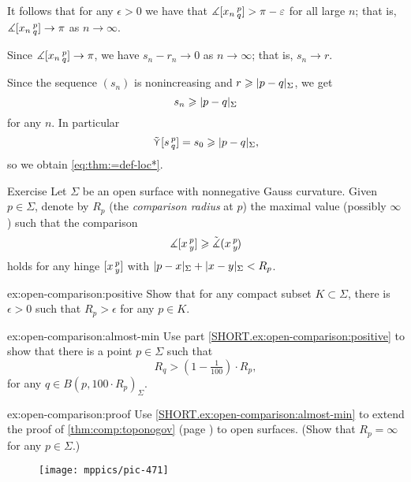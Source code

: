 It follows that for any $\epsilon>0$ we have that $\measuredangle[x_n\,{}^{p}_{q}]> \pi-\varepsilon$ for all large $n$;
that is, $\measuredangle[x_n\,{}^{p}_{q}]\to \pi$ as $n\to\infty$.

Since $\measuredangle[x_n\,{}^{p}_{q}]\to \pi$, we have 
$s_n-r_n\to 0$ as $n\to\infty$;
that is, $s_n\to r$.

Since the sequence $(s_n)$ is nonincreasing and $r\ge \dist{p}{q}\Sigma$, we get
\[s_n\ge \dist{p}{q}\Sigma\]
for any $n$.
In particular
\[\side\hinge spq=s_0\ge \dist{p}{q}\Sigma,\] so we obtain \ref{eq:thm:=def-loc*}.
\qeds

\begin{thm}{Exercise}\label{ex:open-comparison}
Let $\Sigma$ be an open surface with nonnegative Gauss curvature.
Given $p\in\Sigma$, denote by $R_p$ 
(the {}\emph{comparison radius} at $p$) 
the maximal value (possibly $\infty$) such that the comparison 
\[\measuredangle[x\,{}^{p}_{y}]
\geqslant\tilde\measuredangle(x\,{}^{p}_{y}\hspace{-0.2ex})\]
holds for any hinge $[x\,{}^{p}_{y}]$ with $\dist{p}{x}\Sigma+\dist{x}{y}\Sigma<R_p$.

\begin{subthm}{ex:open-comparison:positive}
Show that for any compact subset $K\subset \Sigma$, there is $\epsilon>0$ such that $R_p>\epsilon$ for any $p\in K$.
\end{subthm}

\begin{subthm}{ex:open-comparison:almost-min}
Use part \ref{SHORT.ex:open-comparison:positive} to show that 
there is a point $p\in\Sigma$ such that 
\[R_q>(1-\tfrac1{100})\cdot R_p,\]
for any $q\in B(p,100\cdot R_p)_\Sigma$.
\end{subthm}

\begin{subthm}{ex:open-comparison:proof}
Use \ref{SHORT.ex:open-comparison:almost-min} to extend the proof of \ref{thm:comp:toponogov} (page \pageref{proof(thm:comp:toponogov)}) to open surfaces. 
(Show that $R_p=\infty$ for any $p\in\Sigma$.) 
\end{subthm}


\end{thm}


\begin{wrapfigure}{r}{30 mm}
\vskip4mm
\centering
\texttt{[image: mppics/pic-471]}
\end{wrapfigure}


